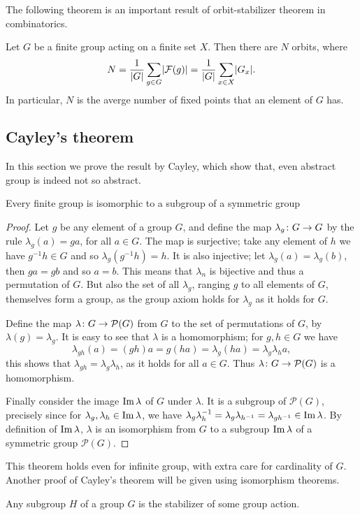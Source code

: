 \documentclass[main.tex]{subfiles}
\begin{document}
			The following theorem is an important result of orbit-stabilizer theorem in combinatorics.
			\begin{theorem} 
				Let $G$ be a finite group acting on a finite set $X$. Then there are $N$ orbits, where
				\begin{equation*}
					N = \frac{1}{\lvert G\rvert}\sum_{g\in G} \lvert\mathcal{F}(g)\rvert = \frac{1}{\lvert G\rvert}\sum_{x \in X}\lvert G_x\rvert.
				\end{equation*}
				In particular, $N$ is the averge number of fixed points that an element of $G$ has.
			\end{theorem}
			\subsection{Cayley's theorem}
				In this section we prove the result by Cayley, which show that, even abstract group is indeed not so abstract. 
				\begin{theorem} 
					Every finite group is isomorphic to a subgroup of a symmetric group
				\end{theorem}
				\begin{proof}
					Let $g$ be any element of a group $G$, and define the map $\lambda_g \colon G \rightarrow G$ by the rule $\lambda_g(a) = ga$, for all $a \in G$. The map is surjective; take any element of $h$ we have $g^{-1}h\in G$ and so $\lambda_g(g^{-1}h) = h$. It is also injective; let $\lambda_g(a) = \lambda_g(b)$, then $ga = gb$ and so $a = b$. This means that $\lambda_n$ is bijective and thus a permutation of $G$.	But also the set of all $\lambda_g$, ranging $g$ to all elements of $G$, themselves form a group, as the group axiom holds for $\lambda_g$ as it holds for $G$. 
					
					Define the map $\lambda \colon G \rightarrow \mathcal P(G)$ from $G$ to the set of permutations of $G$, by $\lambda(g) = \lambda_g$. It is easy to see that $\lambda$ is a homomorphism; for $g, h \in G$ we have 
					\begin{equation*}
						\lambda_{gh}(a) = (gh)a = g(ha) = \lambda_{g}(ha) = \lambda_g \lambda_h a,
					\end{equation*}
					this shows that $\lambda_{gh} = \lambda_g \lambda_h$, as it holds for all $a \in G$. Thus $\lambda \colon G \rightarrow \mathcal{P}(G)$ is a homomorphism.
					
					Finally consider the image $\operatorname{Im} \lambda$ of $G$ under $\lambda$. It is a subgroup of $\mathcal{P}(G)$, precisely since for $\lambda_{g}, \lambda_h \in \operatorname{Im} \lambda$, we have $\lambda_g \lambda^{-1}_h = \lambda_g\lambda_{h^{-1}} = \lambda_{gh^{-1}} \in \operatorname{Im} \lambda$. By definition of $\operatorname{Im} \lambda$, $\lambda$ is an isomorphism from $G$ to a subgroup $\operatorname{Im} \lambda$ of a symmetric group $\mathcal{P}(G)$. 
				\end{proof}
				This theorem holds even for infinite group, with extra care for cardinality of $G$. Another proof of Cayley's theorem will be given using isomorphism theorems.
				\begin{theorem}
					Any subgroup $H$ of a group $G$ is the stabilizer of some group action. 
				\end{theorem}
\end{document}
